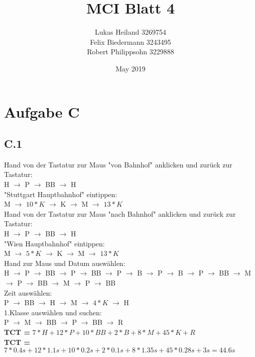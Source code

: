 \documentclass{article}
\title{MCI Blatt 4}
\author{Lukas Heiland 3269754\\ Felix Biedermann 3243495\\ Robert Philippsohn 3229888 }
\date{May 2019}
\begin{document}
\maketitle

\section*{Aufgabe C}
    \subsection*{C.1}
        Hand von der Tastatur zur Maus "von Bahnhof" anklicken und zurück zur Tastatur:\\
        H $\rightarrow$ P $\rightarrow$ BB $\rightarrow$ H\\
        "Stuttgart Hauptbahnhof" eintippen:\\
        M $\rightarrow$ $10*K$ $\rightarrow$ K $\rightarrow$ M $\rightarrow$ $13*K$\\
        Hand von der Tastatur zur Maus "nach Bahnhof" anklicken und zurück zur Tastatur:\\
        H $\rightarrow$ P $\rightarrow$ BB $\rightarrow$ H\\
        "Wien Hauptbahnhof" eintippen:\\
        M $\rightarrow$ $5*K$ $\rightarrow$ K $\rightarrow$ M $\rightarrow$ $13*K$\\
       	Hand zur Maus und Datum auswählen:\\
       	H $\rightarrow$ P $\rightarrow$ BB $\rightarrow$ P $\rightarrow$ BB $\rightarrow$ P $\rightarrow$ B $\rightarrow$ P $\rightarrow$ B $\rightarrow$ P $\rightarrow$ BB $\rightarrow$ M $\rightarrow$ P $\rightarrow$ BB $\rightarrow$ M $\rightarrow$ P $\rightarrow$ BB\\
       	Zeit auswählen:\\
       	P $\rightarrow$ BB $\rightarrow$ H $\rightarrow$ M $\rightarrow$ $4*K$ $\rightarrow$ H\\
       	1.Klasse auswählen und suchen:\\
       	P $\rightarrow$ M $\rightarrow$ BB $\rightarrow$ P $\rightarrow$ BB $\rightarrow$ R\\
       	
       	\textbf{TCT =} $7*H + 12*P + 10*BB + 2*B + 8*M + 45*K + R$\\
       	\hspace*{5.5mm}\textbf{TCT =} $7*0.4s + 12*1.1s + 10*0.2s + 2*0.1s + 8*1.35s + 45*0.28s + 3s = 44.6s $
\end{document}
